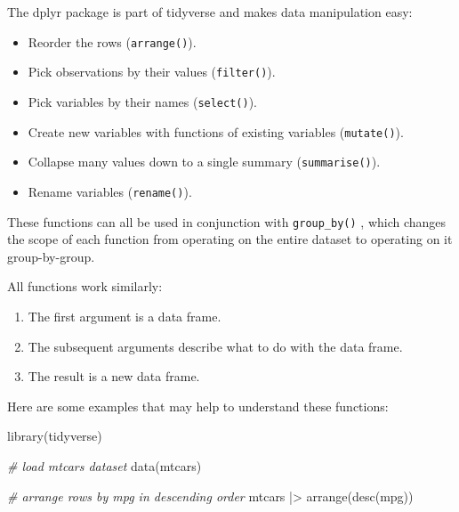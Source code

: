 \documentclass[
  12pt,
  oneside]{book}
\newenvironment{Shaded}{\begin{snugshade}}{\end{snugshade}}
\newcommand{\CommentTok}[1]{\textcolor[rgb]{0.56,0.35,0.01}{\textit{#1}}}
\newcommand{\FunctionTok}[1]{\textcolor[rgb]{0.00,0.00,0.00}{#1}}
\newcommand{\NormalTok}[1]{#1}
\newcommand{\SpecialCharTok}[1]{\textcolor[rgb]{0.00,0.00,0.00}{#1}}
\providecommand{\tightlist}{%
  \setlength{\itemsep}{0pt}\setlength{\parskip}{0pt}}
\theoremstyle{definition}
\theoremstyle{definition}
\theoremstyle{definition}
\theoremstyle{definition}
\theoremstyle{remark}
\begin{document}
The dplyr package is part of tidyverse and makes data manipulation easy:

\begin{itemize}
\tightlist
\item
  Reorder the rows (\texttt{arrange()}).
\item
  Pick observations by their values (\texttt{filter()}).
\item
  Pick variables by their names (\texttt{select()}).
\item
  Create new variables with functions of existing variables
  (\texttt{mutate()}).
\item
  Collapse many values down to a single summary (\texttt{summarise()}).
\item
  Rename variables (\texttt{rename()}).
\end{itemize}

These functions can all be used in conjunction with \texttt{group\_by()} , which changes the scope of each function from operating on the entire dataset to operating on it group-by-group.

All functions work similarly:

\begin{enumerate}
\def\labelenumi{\arabic{enumi}.}
\tightlist
\item
  The first argument is a data frame.
\item
  The subsequent arguments describe what to do with the data frame.
\item
  The result is a new data frame.
\end{enumerate}

Here are some examples that may help to understand these functions:

\begin{Shaded}
\begin{Highlighting}[]
\FunctionTok{library}\NormalTok{(tidyverse)}

\CommentTok{\# load mtcars dataset}
\FunctionTok{data}\NormalTok{(mtcars)}

\CommentTok{\# arrange rows by mpg in descending order}
\NormalTok{mtcars }\SpecialCharTok{|\textgreater{}} 
  \FunctionTok{arrange}\NormalTok{(}\FunctionTok{desc}\NormalTok{(mpg))}
\end{Highlighting}
\end{Shaded}
\end{document}

